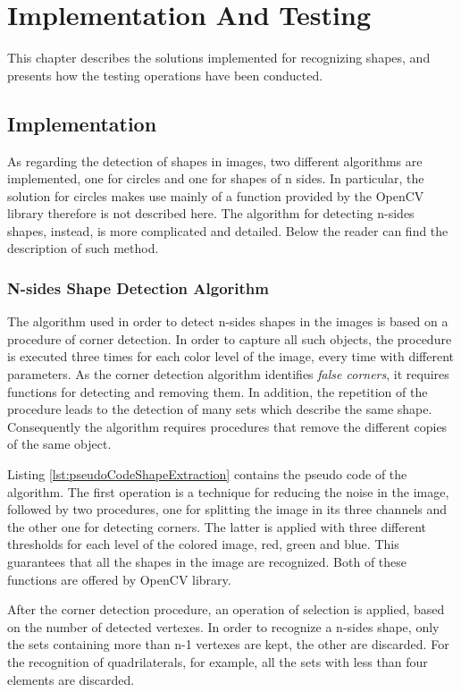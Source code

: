 \chapter{Implementation And Testing}\label{impl_test}
	This chapter describes the solutions implemented for recognizing shapes, and presents how the testing operations have been conducted.
	
	
	\section{Implementation}
		As regarding the detection of shapes in images, two different algorithms are implemented, one for circles and one for shapes of n sides.
		In particular, the solution for circles makes use mainly of a function provided by the \mbox{OpenCV} library therefore is not described here.
		The algorithm for detecting n-sides shapes, instead, is more complicated and detailed. 
		Below the reader can find the description of such method.
	
		\subsection{N-sides Shape Detection Algorithm}
		The algorithm used in order to detect n-sides shapes in the images is based on a procedure of corner detection. 
		In order to capture all such objects, the procedure is executed three times for each color level of the image, every time with different parameters.
		As the corner detection algorithm identifies \emph{false corners}, it requires functions for detecting and removing them. 
		In addition, the repetition of the procedure leads to the detection of many sets which describe the same shape.	
		Consequently the algorithm requires procedures that remove the different copies of the same object.


		
		Listing \ref{lst:pseudoCodeShapeExtraction} contains the pseudo code of the algorithm.
		The first operation is a technique for reducing the noise in the image, followed by two procedures, one for splitting the image in its three channels and the other one for detecting corners.
		The latter is applied with three different thresholds for each level of the colored image, red, green and blue.
		This guarantees that all the shapes in the image are recognized.
		Both of these functions are offered by \mbox{OpenCV} library.

		
		After the corner detection procedure, an operation of selection is applied, based on the number of detected vertexes.
		In order to recognize a n-sides shape, only the sets containing more than n-1 vertexes are kept, the other are discarded.
		For the recognition of quadrilaterals, for example, all the sets with less than four elements are discarded.
		
